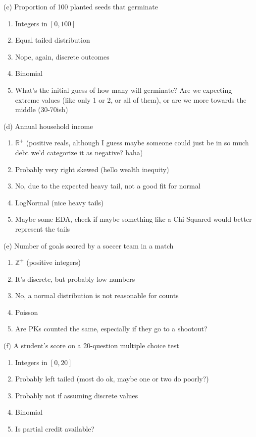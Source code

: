 \documentclass{article}
\newcommand{\real}{\mathbb{R}} %
\begin{document}
(c) Proportion of 100 planted seeds that germinate

\begin{enumerate}
    \item Integers in $[0, 100]$
    \item Equal tailed distribution
    \item Nope, again, discrete outcomes
    \item Binomial
    \item What's the initial guess of how many will germinate? Are we expecting extreme values (like only 1 or 2, or all of them), or are we more towards the middle (30-70ish)
\end{enumerate}

(d) Annual household income

\begin{enumerate}
    \item $\real^{+}$ (positive reals, although I guess maybe someone could just be in so much debt we'd categorize it as negative? haha)
    \item Probably very right skewed (hello wealth inequity)
    \item No, due to the expected heavy tail, not a good fit for normal
    \item LogNormal (nice heavy tails)
    \item Maybe some EDA, check if maybe something like a Chi-Squared would better represent the tails
\end{enumerate}

(e) Number of goals scored by a soccer team in a match

\begin{enumerate}
    \item $\mathbb{Z}^{+}$ (positive integers)
    \item It's discrete, but probably low numbers
    \item No, a normal distribution is not reasonable for counts
    \item Poisson
    \item Are PKs counted the same, especially if they go to a shootout?
\end{enumerate}

(f) A student's score on a 20-question multiple choice test

\begin{enumerate}
    \item Integers in $[0, 20]$
    \item Probably left tailed (most do ok, maybe one or two do poorly?)
    \item Probably not if assuming discrete values
    \item Binomial
    \item Is partial credit available?
\end{enumerate}
\end{document}
